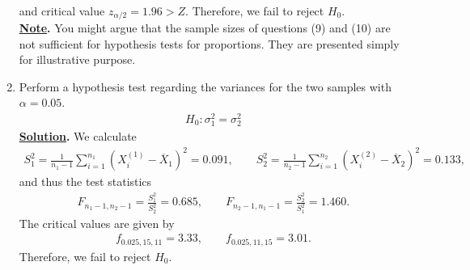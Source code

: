 \begin{enumerate}
\begin{align*}
	\end{align*}
	and critical value $z_{\alpha/2} = 1.96 > Z$. Therefore, we fail to reject $H_0$.\\
	\textbf{\underline{Note}.} You might argue that the sample sizes of questions (9) and (10) are not sufficient for hypothesis tests for proportions. They are presented simply for illustrative purpose.
	\item Perform a hypothesis test regarding the variances for the two samples with $\alpha = 0.05$.
	\begin{align*}
	H_0: \sigma_1^2 = \sigma_2^2
	\end{align*}
	\textbf{\underline{Solution}.} We calculate
	\begin{align*}
	S_1^2 = \frac{1}{n_1-1}\sum_{i=1}^{n_1}(X_i^{(1)}-\overline{X}_1)^2 = 0.091, \qquad S_2^2 = \frac{1}{n_2-1}\sum_{i=1}^{n_2}(X_i^{(2)}-\overline{X}_2)^2 = 0.133,
	\end{align*}
	and thus the test statistics
	\begin{align*}
	F_{n_1-1,n_2-1} = \frac{S_1^2}{S_2^2} = 0.685, \qquad F_{n_2-1,n_1-1} = \frac{S_2^2}{S_1^2} = 1.460.
	\end{align*}
	The critical values are given by
	\begin{align*}
	f_{0.025, 15, 11} = 3.33, \qquad f_{0.025, 11, 15} = 3.01.
	\end{align*}
	Therefore, we fail to reject $H_0$.
\end{enumerate}
